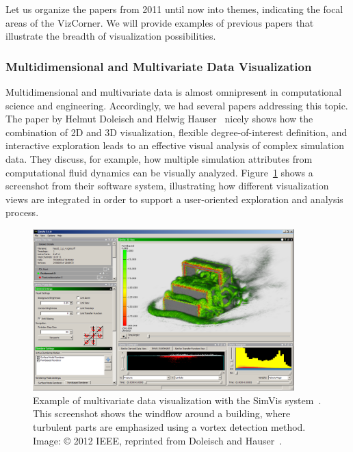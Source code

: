 \documentclass[10pt,journal,compsoc]{IEEEtran}
\begin{document}
Let us organize the papers from 2011 until now into themes, indicating the focal areas of the VizCorner. 
We will provide examples of previous papers that illustrate the breadth of visualization possibilities.


\subsubsection{Multidimensional and Multivariate Data Visualization}

Multidimensional and multivariate data is almost omnipresent in computational science and engineering. Accordingly, we had several papers addressing this topic.
The paper by Helmut Doleisch and Helwig Hauser~\cite{Doleisch2012} nicely shows how the combination of 2D and 3D visualization, flexible degree-of-interest definition, and interactive exploration leads to an effective visual analysis of complex simulation data. They discuss, for example, how multiple simulation attributes from computational fluid dynamics can be visually analyzed. Figure~\ref{fig:simvis} shows a screenshot from their software system, illustrating how different visualization views are integrated in order to support a user-oriented exploration and analysis process.

\begin{figure}
    \begin{center}    
        \includegraphics[width=0.9\textwidth]{simvis.png}
        \caption{Example of multivariate data visualization with the SimVis system~\cite{Doleisch2012}. This screenshot shows the windflow around a building, where turbulent parts are emphasized using a vortex detection method. Image: \copyright{} 2012 IEEE, reprinted from Doleisch and Hauser~\cite{Doleisch2012}.
  \label{fig:simvis}}        
    \end{center}
\end{figure}
\end{document}
